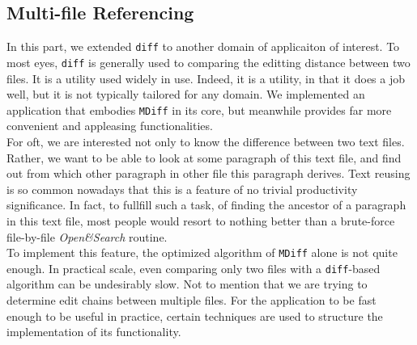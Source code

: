 \documentclass{article}
\begin{document}
\subsection{Multi-file Referencing}
In this part, we extended \texttt{diff} to another domain of applicaiton of interest. To most eyes, \texttt{diff} is generally used to comparing the editting distance between two files. It is a utility used widely in use. Indeed, it is a utility, in that it does a job well, but it is not typically tailored for any domain. We implemented an application that embodies \texttt{MDiff} in its core, but meanwhile provides far more convenient and appleasing functionalities. \\

For oft, we are interested not only to know the difference between two text files. Rather, we want to be able to look at some paragraph of this text file, and find out from which other paragraph in other file this paragraph derives. Text reusing is so common nowadays that this is a feature of no trivial productivity significance. In fact, to fullfill such a task, of finding the ancestor of a paragraph in this text file, most people would resort to nothing better than a brute-force file-by-file \textit{Open\&Search} routine. \\

To implement this feature, the optimized algorithm of \texttt{MDiff} alone is not quite enough. In practical scale, even comparing only two files with a \texttt{diff}-based algorithm can be undesirably slow. Not to mention that we are trying to determine edit chains between multiple files. For the application to be fast enough to be useful in practice, certain techniques are used to structure the implementation of its functionality.\\
\end{document}
